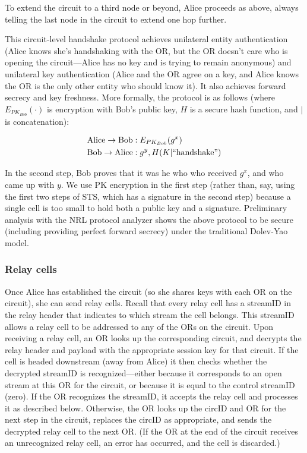\documentclass[times,10pt,twocolumn]{article}
\begin{document}
To extend the circuit to a third node or beyond, Alice
proceeds as above, always telling the last node in the circuit to
extend one hop further.

This circuit-level handshake protocol achieves unilateral entity
authentication (Alice knows she's handshaking with the OR, but
the OR doesn't care who is opening the circuit---Alice has no key
and is trying to remain anonymous) and unilateral key authentication
(Alice and the OR agree on a key, and Alice knows the OR is the
only other entity who should know it). It also achieves forward
secrecy and key freshness. More formally, the protocol is as follows
(where $E_{PK_{Bob}}(\cdot)$ is encryption with Bob's public key,
$H$ is a secure hash function, and $|$ is concatenation):

\begin{equation}
\begin{aligned}
\mathrm{Alice} \rightarrow \mathrm{Bob}&: E_{PK_{Bob}}(g^x) \\
\mathrm{Bob} \rightarrow \mathrm{Alice}&: g^y, H(K | \mathrm{``handshake"}) \\
\end{aligned}
\end{equation}

In the second step, Bob proves that it was he who who received $g^x$,
and who came up with $y$. We use PK encryption in the first step
(rather than, say, using the first two steps of STS, which has a
signature in the second step) because a single cell is too small to
hold both a public key and a signature. Preliminary analysis with the
NRL protocol analyzer \cite{meadows96} shows the above protocol to be
secure (including providing perfect forward secrecy) under the
traditional Dolev-Yao model.

\subsubsection{Relay cells}

Once Alice has established the circuit (so she shares keys with each
OR on the circuit), she can send relay cells.  Recall that every relay
cell has a streamID in the relay header that indicates to which
stream the cell belongs.  This streamID allows a relay cell to be
addressed to any of the ORs on the circuit.  Upon receiving a relay
cell, an OR looks up the corresponding circuit, and decrypts the relay
header and payload with the appropriate session key for that circuit.
If the cell is headed downstream (away from Alice) it then checks
whether the decrypted streamID is recognized---either because it
corresponds to an open stream at this OR for the circuit, or because
it is equal to the control streamID (zero).  If the OR recognizes the
streamID, it accepts the relay cell and processes it as described
below.  Otherwise, 
the OR looks up the circID and OR for the
next step in the circuit, replaces the circID as appropriate, and
sends the decrypted relay cell to the next OR.  (If the OR at the end
of the circuit receives an unrecognized relay cell, an error has
occurred, and the cell is discarded.)
\end{document}
